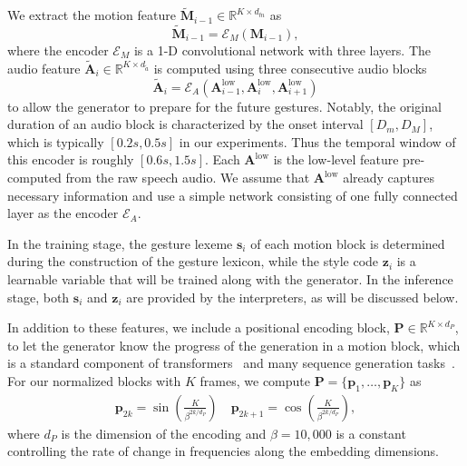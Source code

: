 \documentclass[acmtog,authorversion]{acmart}
\newcommand{\vect}[1]{\bm{#1}}
\newcommand{\tildevect}[1]{\vect{\tilde{#1}}}
\newcommand{\eqword}[1]{{\text{#1}}}
\begin{document}
We extract the motion feature $\tildevect{M}_{i-1}\in\mathbb{R}^{K\times{}d_{\tilde{m}}}$ as 
\begin{equation}
    \tildevect{M}_{i-1} = \mathcal{E}_M(\vect{M}_{i-1}),
\end{equation}
where the encoder $\mathcal{E}_M$ is a 1-D convolutional network with three layers.
The audio feature $\tildevect{A}_{i}\in\mathbb{R}^{K\times{}d_{\tilde{a}}}$ is computed using three consecutive audio blocks
\begin{equation}
    \tildevect{A}_{i} = \mathcal{E}_A(\vect{A}^{\eqword{low}}_{i-1},\vect{A}^{\eqword{low}}_{i},\vect{A}^{\eqword{low}}_{i+1})
\end{equation}
to allow the generator to prepare for the future gestures. 
Notably, the original duration of an audio block is characterized by the onset interval $[D_m, D_M]$, which is typically $[0.2s, 0.5s]$ in our experiments. Thus the temporal window of this encoder is roughly $[0.6s, 1.5s]$.
Each $\vect{A}^{\eqword{low}}$ is the low-level feature pre-computed from the raw speech audio. We assume that $\vect{A}^{\eqword{low}}$ already captures necessary information and use a simple network consisting of one fully connected layer as the encoder $\mathcal{E}_A$.

In the training stage, the gesture lexeme $\vect{s}_i$ of each motion block is determined during the construction of the gesture lexicon, while the style code $\vect{z}_i$ is a learnable variable that will be trained along with the generator. In the inference stage, both $\vect{s}_i$ and $\vect{z}_i$ are provided by the interpreters, as will be discussed below.

In addition to these features, we include a positional encoding block, $\vect{P}\in\mathbb{R}^{K\times{}d_{P}}$, to let the generator know the progress of the generation in a motion block, which is a standard component of transformers~\cite{Vaswani2017_Attentiona} and many sequence generation tasks~\cite{Harvey2020_motionInBetween}. For our normalized blocks with $K$ frames, we compute $\vect{P}=\{\vect{p}_1,\dots,\vect{p}_K\}$ as
\begin{align}
    \vect{p}_{2k} = \sin\left(\frac{K}{\beta^{2k/d_{P}}}\right) \quad
    \vect{p}_{2k+1} = \cos\left(\frac{K}{\beta^{2k/d_{P}}}\right),
    \label{eqn:pos_enc}
\end{align}
where $d_{P}$ is the dimension of the encoding and $\beta=10,000$ is a constant controlling the rate of change in frequencies along the embedding dimensions.
\end{document}
